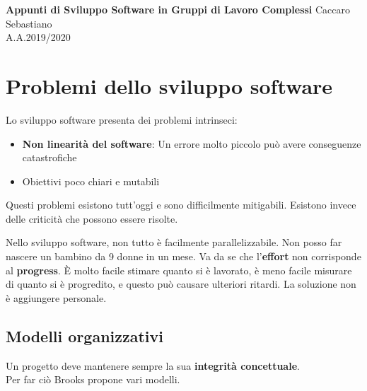 \documentclass[a4paper,12pt]{article}
\begin{document}
\begin{titlepage}
\begin{center}
	\Large{\textbf{Appunti di Sviluppo Software in Gruppi di Lavoro Complessi}}
\vfill
\normalsize{Caccaro Sebastiano}\\
\normalsize{A.A.2019/2020}
\end{center}
\end{titlepage}

\tableofcontents

\clearpage


\section{Problemi dello sviluppo software}
Lo sviluppo software presenta dei problemi intrinseci:
\begin{itemize}
\item \textbf{Non linearità del software}: Un errore molto piccolo può avere conseguenze catastrofiche
\item Obiettivi poco chiari e mutabili
\end{itemize}
Questi problemi esistono tutt'oggi e sono difficilmente mitigabili. Esistono invece delle criticità che possono essere risolte.


Nello sviluppo software, non tutto è facilmente parallelizzabile. Non posso far nascere un bambino da 9 donne in un mese. Va da se che l'\textbf{effort} non corrisponde al \textbf{progress}. \`E molto facile stimare quanto si è lavorato, è meno facile misurare di quanto si è progredito, e questo può causare ulteriori ritardi. La soluzione non è aggiungere personale.

\subsection{Modelli organizzativi}
Un progetto deve mantenere sempre la sua \textbf{integrità concettuale}.\\
Per far ciò Brooks propone vari modelli.
\end{document}
